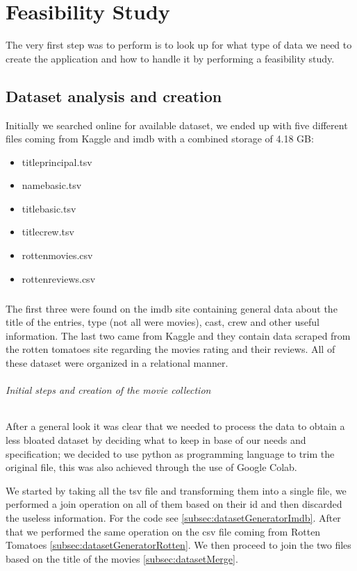 




\chapter{Feasibility Study}
\justifying
The very first step was to perform is to look up for what type of data we need to create the application and how to handle it by performing a feasibility study.
\section{Dataset analysis and creation}
Initially we searched online for available dataset, we ended up with five different files coming from Kaggle and imdb with a combined storage of 4.18 GB:
\begin{itemize}
  \item title\textunderscore principal.tsv  
  \item name\textunderscore basic.tsv 
  \item title\textunderscore basic.tsv 
  \item title\textunderscore crew.tsv
  \item rotten\textunderscore movies.csv
  \item rotten\textunderscore reviews.csv 
\end{itemize} 
\paragraph{}
The first three were found on the imdb site containing general data about the title of the entries, type (not all were movies), cast, crew and other useful information. The last two came from Kaggle and they contain data scraped from the rotten tomatoes site regarding the movies rating and their reviews. All of these dataset were organized in a relational manner.
\subparagraph{Initial steps and creation of the movie collection}
After a general look it was clear that we needed to process the data to obtain a less bloated dataset by deciding what to keep in base of our needs and specification; we decided to use python as programming language to trim the original file, this was also achieved through the use of Google Colab.

We started by taking all the tsv file and transforming them into a single file, we performed a join operation on all of them based on their id and then discarded the useless information. For the code see  \cref{subsec:datasetGeneratorImdb}. After that we performed the same operation on the csv file coming from Rotten Tomatoes \cref{subsec:datasetGeneratorRotten}. We then proceed to join the two files based on the title of the movies \cref{subsec:datasetMerge}.

